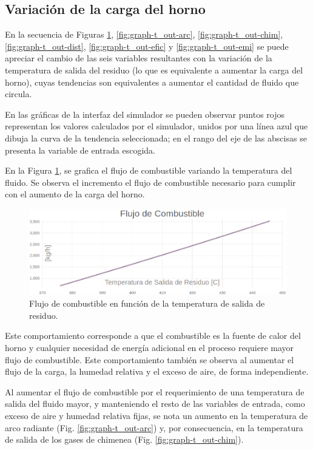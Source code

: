 \subsection{Variación de la carga del horno}
\par En la secuencia de Figuras \ref{fig:graph-t_out-fuel}, \ref{fig:graph-t_out-arc}, \ref{fig:graph-t_out-chim}, \ref{fig:graph-t_out-dist}, \ref{fig:graph-t_out-efic} y \ref{fig:graph-t_out-emi} se puede apreciar el cambio de las seis variables resultantes con la variación de la temperatura de salida del residuo (lo que es equivalente a aumentar la carga del horno), cuyas tendencias son equivalentes a aumentar el cantidad de fluido que circula.
\par En las gráficas de la interfaz del simulador se pueden observar puntos rojos representan los valores calculados por el simulador, unidos por una línea azul que dibuja la curva de la tendencia seleccionada; en el rango del eje de las abscisas se presenta la variable de entrada escogida.
\par En la Figura \ref{fig:graph-t_out-fuel}, se grafica el flujo de combustible variando la temperatura del fluido. Se observa el incremento el flujo de combustible necesario para cumplir con el aumento de la carga del horno.
\begin{figure}[H]\begin{center}
\includegraphics[scale=0.46]{images/graph-t_out-fuel}
\caption[Flujo de combustible en función de Temperatura de salida de residuo]{Flujo de combustible en función de la temperatura de salida de residuo.}
\label{fig:graph-t_out-fuel}\end{center}\end{figure}
\par Este comportamiento corresponde a que el combustible es la fuente de calor del horno y cualquier necesidad de energía adicional en el proceso requiere mayor flujo de combustible. Este comportamiento también se observa al aumentar el flujo de la carga, la humedad relativa y el exceso de aire, de forma independiente.
\par Al aumentar el flujo de combustible por el requerimiento de una temperatura de salida del fluido mayor, y manteniendo el resto de las variables de entrada, como exceso de aire y humedad relativa fijas, se nota un aumento en la temperatura de arco radiante (Fig. \ref{fig:graph-t_out-arc}) y, por consecuencia, en la temperatura de salida de los gases de chimenea (Fig. \ref{fig:graph-t_out-chim}).
